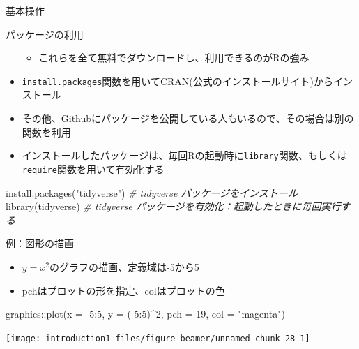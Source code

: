 \documentclass[
  ignorenonframetext,
]{beamer}
\newenvironment{Shaded}{\begin{snugshade}}{\end{snugshade}}
\newcommand{\AttributeTok}[1]{\textcolor[rgb]{0.77,0.63,0.00}{#1}}
\newcommand{\CommentTok}[1]{\textcolor[rgb]{0.56,0.35,0.01}{\textit{#1}}}
\newcommand{\DecValTok}[1]{\textcolor[rgb]{0.00,0.00,0.81}{#1}}
\newcommand{\FunctionTok}[1]{\textcolor[rgb]{0.00,0.00,0.00}{#1}}
\newcommand{\NormalTok}[1]{#1}
\newcommand{\SpecialCharTok}[1]{\textcolor[rgb]{0.00,0.00,0.00}{#1}}
\newcommand{\StringTok}[1]{\textcolor[rgb]{0.31,0.60,0.02}{#1}}
\providecommand{\tightlist}{%
  \setlength{\itemsep}{0pt}\setlength{\parskip}{0pt}}
\begin{document}
\begin{frame}[fragile]{基本操作}
\begin{block}{パッケージの利用}
\begin{itemize}
  \begin{itemize}
  \tightlist
  \item
    これらを全て無料でダウンロードし、利用できるのがRの強み
  \end{itemize}
\item
  \texttt{install.packages}関数を用いてCRAN(公式のインストールサイト)からインストール
\item
  その他、Githubにパッケージを公開している人もいるので、その場合は別の関数を利用
\item
  インストールしたパッケージは、毎回Rの起動時に\texttt{library}関数、もしくは\texttt{require}関数を用いて有効化する
\end{itemize}

\begin{Shaded}
\begin{Highlighting}[]
\FunctionTok{install.packages}\NormalTok{(}\StringTok{"tidyverse"}\NormalTok{) }\CommentTok{\# tidyverse パッケージをインストール}
\FunctionTok{library}\NormalTok{(tidyverse) }\CommentTok{\# tidyverse パッケージを有効化：起動したときに毎回実行する}
\end{Highlighting}
\end{Shaded}
\end{block}

\begin{block}{例：図形の描画}
\protect\hypertarget{ux4f8bux56f3ux5f62ux306eux63cfux753b}{}
\begin{itemize}
\tightlist
\item
  \(y = x^2\)のグラフの描画、定義域は-5から5
\item
  pchはプロットの形を指定、colはプロットの色
\end{itemize}

\begin{Shaded}
\begin{Highlighting}[]
\NormalTok{graphics}\SpecialCharTok{::}\FunctionTok{plot}\NormalTok{(}\AttributeTok{x =} \SpecialCharTok{{-}}\DecValTok{5}\SpecialCharTok{:}\DecValTok{5}\NormalTok{, }\AttributeTok{y =}\NormalTok{ (}\SpecialCharTok{{-}}\DecValTok{5}\SpecialCharTok{:}\DecValTok{5}\NormalTok{)}\SpecialCharTok{\^{}}\DecValTok{2}\NormalTok{, }\AttributeTok{pch =} \DecValTok{19}\NormalTok{, }\AttributeTok{col =} \StringTok{"magenta"}\NormalTok{) }
\end{Highlighting}
\end{Shaded}

\begin{center}\texttt{[image: introduction1\_files/figure-beamer/unnamed-chunk-28-1]} \end{center}
\end{block}
\end{frame}
\end{document}
